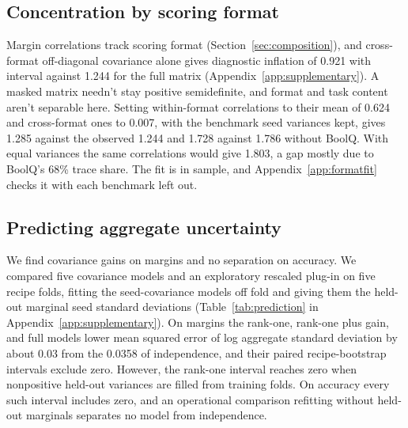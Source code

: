 \subsection{Concentration by scoring format}
Margin correlations track scoring format (Section~\ref{sec:composition}), and cross-format off-diagonal covariance alone gives diagnostic inflation of 0.921 with interval  against 1.244 for the full matrix (Appendix~\ref{app:supplementary}). A masked matrix needn't stay positive semidefinite, and format and task content aren't separable here. Setting within-format correlations to their mean of 0.624 and cross-format ones to 0.007, with the benchmark seed variances kept, gives 1.285 against the observed 1.244 and 1.728 against 1.786 without BoolQ. With equal variances the same correlations would give 1.803, a gap mostly due to BoolQ's 68\% trace share. The fit is in sample, and Appendix~\ref{app:formatfit} checks it with each benchmark left out.

\subsection{Predicting aggregate uncertainty}
\label{sec:prediction}
We find covariance gains on margins and no separation on accuracy. We compared five covariance models and an exploratory rescaled plug-in on five recipe folds, fitting the seed-covariance models off fold and giving them the held-out marginal seed standard deviations (Table~\ref{tab:prediction} in Appendix~\ref{app:supplementary}). On margins the rank-one, rank-one plus gain, and full models lower mean squared error of log aggregate standard deviation by about 0.03 from the 0.0358 of independence, and their paired recipe-bootstrap intervals exclude zero. However, the rank-one interval reaches zero when nonpositive held-out variances are filled from training folds. On accuracy every such interval includes zero, and an operational comparison refitting without held-out marginals separates no model from independence.

